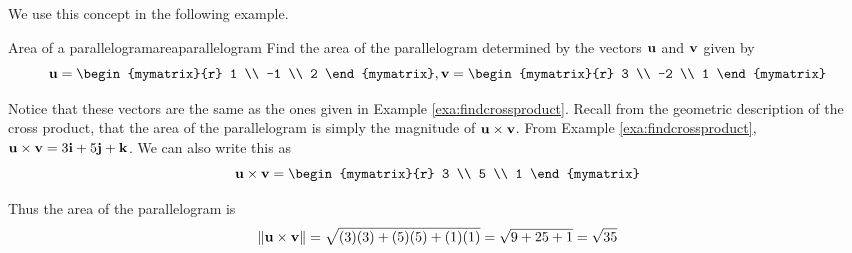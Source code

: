 \begin{center}
\end{center}

We use this concept in the following example.

\begin{example}{Area of a parallelogram}{areaparallelogram}
Find the area of the
 parallelogram determined by the vectors ${\bf u}$
and ${\bf v}$ given by 
\begin{equation*}
\vect{u}
=
\begin{mymatrix}{r}
1 \\
-1 \\
2
\end{mymatrix}, 
\vect{v}
=
\begin{mymatrix}{r}
3 \\
-2 \\
1
\end{mymatrix}
\end{equation*}
\end{example}

\begin{solution}
Notice that these vectors are the same as the ones given in Example \ref{exa:findcrossproduct}.
Recall from the geometric description of the cross
product, that the area of the parallelogram is simply the magnitude of ${\bf u} \times {\bf v}$. 
From Example \ref{exa:findcrossproduct}, ${\bf u} \times {\bf v} = 3{\bf i}+5{\bf j}+{\bf k}$.
We can also write this as
\begin{equation*}
\vect{u} \times \vect{v}
=
\begin{mymatrix}{r}
3 \\
5 \\
1
\end{mymatrix}
\end{equation*}

Thus the area of the parallelogram is 
\begin{equation*}
\| {\bf u} \times {\bf v} \| = 
\sqrt{(3)(3) + (5)(5) + (1)(1)} = 
\sqrt{9+25+1}=\sqrt{35}
\end{equation*}
\end{solution}

